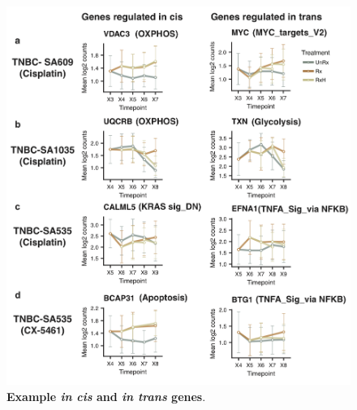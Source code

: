 \begin{figure}
\centering
 \includegraphics[width=\textwidth]{Figures/chap5/fig16_lineplotscistrans.png}
\caption[Example \textit{in cis} and \textit{in trans} genes]
	{\small
	 \textbf{Example \textit{in cis} and \textit{in trans} genes}.
	 }

	\label{fig:cistrans}
\end{figure}



